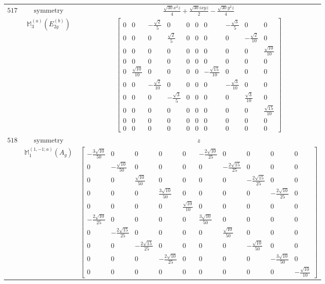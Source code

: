 \documentclass[fleqn,8pt,landscape]{jsarticle}
\begin{document}
\begin{longtable}{ccc}
$ 517 $ & $ \text{symmetry} $ & $ \frac{\sqrt{30} x^{2} z}{4} + \frac{\sqrt{30} i x y z}{2} - \frac{\sqrt{30} y^{2} z}{4} $ \\
$  $ & $ \mathbb{M}_{3}^{(a)}(E_{2g}^{(b)}) $ & $ \begin{bmatrix} 0 & 0 & - \frac{\sqrt{2}}{5} & 0 & 0 & 0 & 0 & - \frac{\sqrt{3}}{5} & 0 & 0 \\ 0 & 0 & 0 & \frac{\sqrt{2}}{5} & 0 & 0 & 0 & 0 & - \frac{\sqrt{2}}{10} & 0 \\ 0 & 0 & 0 & 0 & 0 & 0 & 0 & 0 & 0 & \frac{\sqrt{10}}{10} \\ 0 & 0 & 0 & 0 & 0 & 0 & 0 & 0 & 0 & 0 \\ 0 & \frac{\sqrt{10}}{10} & 0 & 0 & 0 & 0 & - \frac{\sqrt{15}}{10} & 0 & 0 & 0 \\ 0 & 0 & - \frac{\sqrt{2}}{10} & 0 & 0 & 0 & 0 & - \frac{\sqrt{3}}{10} & 0 & 0 \\ 0 & 0 & 0 & - \frac{\sqrt{3}}{5} & 0 & 0 & 0 & 0 & \frac{\sqrt{3}}{10} & 0 \\ 0 & 0 & 0 & 0 & 0 & 0 & 0 & 0 & 0 & \frac{\sqrt{15}}{10} \\ 0 & 0 & 0 & 0 & 0 & 0 & 0 & 0 & 0 & 0 \\ 0 & 0 & 0 & 0 & 0 & 0 & 0 & 0 & 0 & 0 \end{bmatrix} $ \\ \hline
$ 518 $ & $ \text{symmetry} $ & $ z $ \\
$  $ & $ \mathbb{M}_{1}^{(1,-1;a)}(A_{g}) $ & $ \begin{bmatrix} - \frac{3 \sqrt{10}}{50} & 0 & 0 & 0 & 0 & - \frac{2 \sqrt{10}}{25} & 0 & 0 & 0 & 0 \\ 0 & - \frac{\sqrt{10}}{50} & 0 & 0 & 0 & 0 & - \frac{2 \sqrt{15}}{25} & 0 & 0 & 0 \\ 0 & 0 & \frac{\sqrt{10}}{50} & 0 & 0 & 0 & 0 & - \frac{2 \sqrt{15}}{25} & 0 & 0 \\ 0 & 0 & 0 & \frac{3 \sqrt{10}}{50} & 0 & 0 & 0 & 0 & - \frac{2 \sqrt{10}}{25} & 0 \\ 0 & 0 & 0 & 0 & \frac{\sqrt{10}}{10} & 0 & 0 & 0 & 0 & 0 \\ - \frac{2 \sqrt{10}}{25} & 0 & 0 & 0 & 0 & \frac{3 \sqrt{10}}{50} & 0 & 0 & 0 & 0 \\ 0 & - \frac{2 \sqrt{15}}{25} & 0 & 0 & 0 & 0 & \frac{\sqrt{10}}{50} & 0 & 0 & 0 \\ 0 & 0 & - \frac{2 \sqrt{15}}{25} & 0 & 0 & 0 & 0 & - \frac{\sqrt{10}}{50} & 0 & 0 \\ 0 & 0 & 0 & - \frac{2 \sqrt{10}}{25} & 0 & 0 & 0 & 0 & - \frac{3 \sqrt{10}}{50} & 0 \\ 0 & 0 & 0 & 0 & 0 & 0 & 0 & 0 & 0 & - \frac{\sqrt{10}}{10} \end{bmatrix} $ \\ \hline

\end{longtable}
\end{document}
